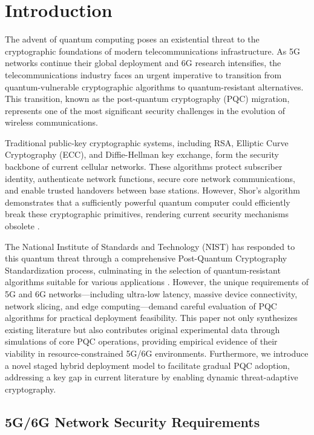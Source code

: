 \documentclass[11pt,a4paper]{article}
\begin{document}
\tableofcontents
\newpage

\section{Introduction}
The advent of quantum computing poses an existential threat to the cryptographic foundations of modern telecommunications infrastructure. As 5G networks continue their global deployment and 6G research intensifies, the telecommunications industry faces an urgent imperative to transition from quantum-vulnerable cryptographic algorithms to quantum-resistant alternatives. This transition, known as the post-quantum cryptography (PQC) migration, represents one of the most significant security challenges in the evolution of wireless communications.

Traditional public-key cryptographic systems, including RSA, Elliptic Curve Cryptography (ECC), and Diffie-Hellman key exchange, form the security backbone of current cellular networks. These algorithms protect subscriber identity, authenticate network functions, secure core network communications, and enable trusted handovers between base stations. However, Shor's algorithm demonstrates that a sufficiently powerful quantum computer could efficiently break these cryptographic primitives, rendering current security mechanisms obsolete \cite{shor1994}.

The National Institute of Standards and Technology (NIST) has responded to this quantum threat through a comprehensive Post-Quantum Cryptography Standardization process, culminating in the selection of quantum-resistant algorithms suitable for various applications \cite{nist2022}. However, the unique requirements of 5G and 6G networks---including ultra-low latency, massive device connectivity, network slicing, and edge computing---demand careful evaluation of PQC algorithms for practical deployment feasibility. This paper not only synthesizes existing literature but also contributes original experimental data through simulations of core PQC operations, providing empirical evidence of their viability in resource-constrained 5G/6G environments. Furthermore, we introduce a novel staged hybrid deployment model to facilitate gradual PQC adoption, addressing a key gap in current literature by enabling dynamic threat-adaptive cryptography.

\subsection{5G/6G Network Security Requirements}
\end{document}
